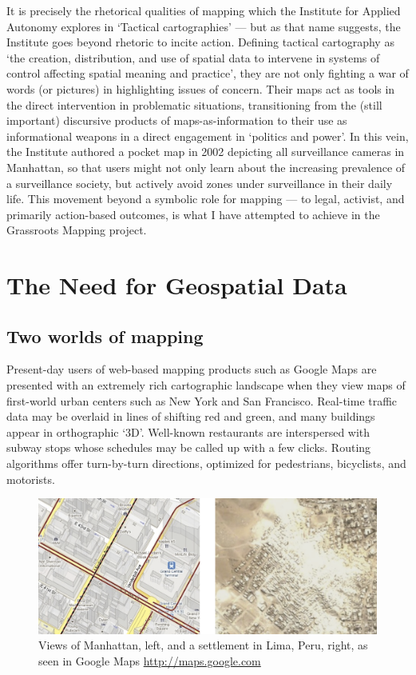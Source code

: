 \documentclass[11pt,oneside,notitlepage]{report}
\begin{document}
{{It is precisely the rhetorical qualities of mapping which the Institute for Applied Autonomy explores in `Tactical cartographies' --- but as that name suggests, the Institute goes beyond rhetoric to incite action. Defining tactical cartography as `the creation, distribution, and use of spatial data to intervene in systems of control affecting spatial meaning and practice', they are not only fighting a war of words (or pictures) in highlighting issues of concern. Their maps act as tools in the direct intervention in problematic situations, transitioning from the (still important) discursive products of maps-as-information to their use as informational weapons in a direct engagement in `politics and power'. \cite{institute2008tactical} In this vein, the Institute authored a pocket map in 2002 depicting all surveillance cameras in Manhattan, so that users might not only learn about the increasing prevalence of a surveillance society, but actively avoid zones under surveillance in their daily life. This movement beyond a symbolic role for mapping --- to legal, activist, and primarily action-based outcomes, is what I have attempted to achieve in the Grassroots Mapping project.

\chapter{The Need for Geospatial Data}
\label{chap:need}

\section{Two worlds of mapping}
\label{sec:twoworlds}

Present-day users of web-based mapping products such as Google Maps are presented with an extremely rich cartographic landscape when they view maps of first-world urban centers such as New York and San Francisco. Real-time traffic data may be overlaid in lines of shifting red and green, and many buildings appear in orthographic `3D'. Well-known restaurants are interspersed with subway stops whose schedules may be called up with a few clicks. Routing algorithms offer turn-by-turn directions, optimized for pedestrians, bicyclists, and motorists. 

\begin{figure}[h]
	\begin{center}
		\includegraphics[width=1\textwidth]{images/two-worlds-mapping.png}
		\caption{Views of Manhattan, left, and a settlement in Lima, Peru, right, as seen in Google Maps \url{http://maps.google.com}}
	\end{center}
\end{figure}

}}
\end{document}
